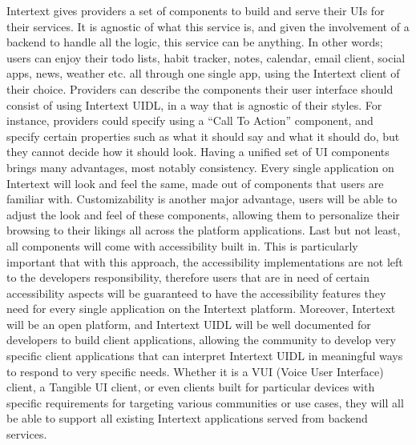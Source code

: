 Intertext gives providers a set of components to build and serve their UIs for their services. It is agnostic of what this service is, and given the involvement of a backend to handle all the logic, this service can be anything. In other words; users can enjoy their todo lists, habit tracker, notes, calendar, email client, social apps, news, weather etc. all through one single app, using the Intertext client of their choice. Providers can describe the components their user interface should consist of using Intertext UIDL, in a way that is agnostic of their styles. For instance, providers could specify using a “Call To Action” component, and specify certain properties such as what it should say and what it should do, but they cannot decide how it should look. Having a unified set of UI components brings many advantages, most notably consistency. Every single application on Intertext will look and feel the same, made out of components that users are familiar with. Customizability is another major advantage, users will be able to adjust the look and feel of these components, allowing them to personalize their browsing to their likings all across the platform applications. Last but not least, all components will come with accessibility built in. This is particularly important that with this approach, the accessibility implementations are not left to the developers responsibility, therefore users that are in need of certain accessibility aspects will be guaranteed to have the accessibility features they need for every single application on the Intertext platform. Moreover, Intertext will be an open platform, and Intertext UIDL will be well documented for developers to build client applications, allowing the community to develop very specific client applications that can interpret Intertext UIDL in meaningful ways to respond to very specific needs. Whether it is a VUI (Voice User Interface) client, a Tangible UI client, or even clients built for particular devices with specific requirements for targeting various communities or use cases, they will all be able to support all existing Intertext applications served from backend services.  

